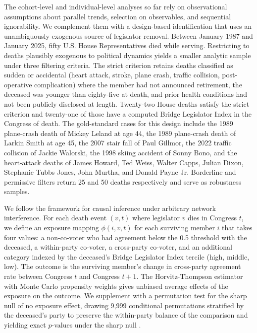 \documentclass[12pt, a4paper]{article}
\begin{document}
The cohort-level and individual-level analyses so far rely on observational assumptions about parallel trends, selection on observables, and sequential ignorability. We complement them with a design-based identification that uses an unambiguously exogenous source of legislator removal. Between January 1987 and January 2025, fifty U.S. House Representatives died while serving. Restricting to deaths plausibly exogenous to political dynamics yields a smaller analytic sample under three filtering criteria. The strict criterion retains deaths classified as sudden or accidental (heart attack, stroke, plane crash, traffic collision, post-operative complication) where the member had not announced retirement, the deceased was younger than eighty-five at death, and prior health conditions had not been publicly disclosed at length. Twenty-two House deaths satisfy the strict criterion and twenty-one of those have a computed Bridge Legislator Index in the Congress of death. The gold-standard cases for this design include the 1989 plane-crash death of Mickey Leland at age 44, the 1989 plane-crash death of Larkin Smith at age 45, the 2007 stair fall of Paul Gillmor, the 2022 traffic collision of Jackie Walorski, the 1998 skiing accident of Sonny Bono, and the heart-attack deaths of James Howard, Ted Weiss, Walter Capps, Julian Dixon, Stephanie Tubbs Jones, John Murtha, and Donald Payne Jr. Borderline and permissive filters return 25 and 50 deaths respectively and serve as robustness samples.

We follow the \citet{aronow2017estimating} framework for causal inference under arbitrary network interference. For each death event $(v, t)$ where legislator $v$ dies in Congress $t$, we define an exposure mapping $\phi(i, v, t)$ for each surviving member $i$ that takes four values: a non-co-voter who had agreement below the 0.5 threshold with the deceased, a within-party co-voter, a cross-party co-voter, and an additional category indexed by the deceased's Bridge Legislator Index tercile (high, middle, low). The outcome is the surviving member's change in cross-party agreement rate between Congress $t$ and Congress $t+1$. The Horvitz-Thompson estimator with Monte Carlo propensity weights gives unbiased average effects of the exposure on the outcome. We supplement with a permutation test for the sharp null of no exposure effect, drawing 9{,}999 conditional permutations stratified by the deceased's party to preserve the within-party balance of the comparison and yielding exact $p$-values under the sharp null \citep{athey2018exact}.
\end{document}
